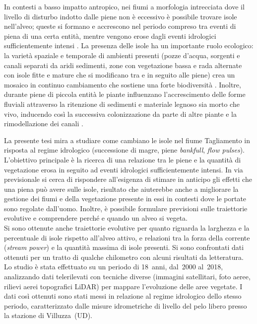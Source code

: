 In contesti a basso impatto antropico, nei fiumi a morfologia intrecciata dove il livello di disturbo indotto dalle piene non è eccessivo è possibile trovare isole nell'alveo;
queste si formano e accrescono nel periodo compreso tra eventi di piena di una certa entità, mentre vengono erose dagli eventi idrologici sufficientemente intensi .
La presenza delle isole ha un importante ruolo ecologico: la varietà spaziale e temporale di ambienti presenti (pozze d'acqua, sorgenti e canali separati da aridi sedimenti, zone con vegetazione bassa e rada alternate con isole fitte e mature che si modificano tra e in seguito alle piene) crea un mosaico in continuo cambiamento che sostiene una forte biodiversità .
Inoltre, durante piene di piccola entità le piante influenzano l'accrescimento delle forme fluviali attraverso la ritenzione di sedimenti e materiale legnoso sia morto che vivo, inducendo così la successiva colonizzazione da parte di altre piante e la rimodellazione dei canali .

La presente tesi mira a studiare come cambiano le isole nel fiume Tagliamento in risposta al regime idrologico (successione di magre, piene \emph{bankfull}, \emph{flow pulses}).
L'obiettivo principale è la ricerca di una relazione tra le piene e la quantità di vegetazione erosa in seguito ad eventi idrologici sufficientemente intensi.
In via previsionale si cerca di rispondere all'esigenza di stimare in anticipo gli effetti che una piena può avere sulle isole, risultato che aiuterebbe anche a migliorare la gestione dei fiumi e della vegetazione presente in essi in contesti dove le portate sono regolate dall'uomo. 
Inoltre, è possibile formulare previsioni sulle traiettorie evolutive e comprendere perché e quando un alveo si vegeta.
\\
Si sono ottenute anche traiettorie evolutive per quanto riguarda la larghezza e la percentuale di isole rispetto all'alveo attivo, e relazioni tra la forza della corrente (\emph{stream power}) e la quantità massima di isole presenti.
Si sono confrontati dati ottenuti per un tratto di qualche chilometro con alcuni risultati da letteratura.
\\
Lo studio è stata effettuato su un periodo di 18~anni, dal~2000 al~2018, analizzando dati telerilevati con tecniche diverse (immagini satellitari, foto aeree, rilievi aerei topografici LiDAR) per mappare l'evoluzione delle aree vegetate.
I dati così ottenuti sono stati messi in relazione al regime idrologico dello stesso periodo, caratterizzato dalle misure idrometriche di livello del pelo libero presso la stazione di Villuzza~(UD). 

